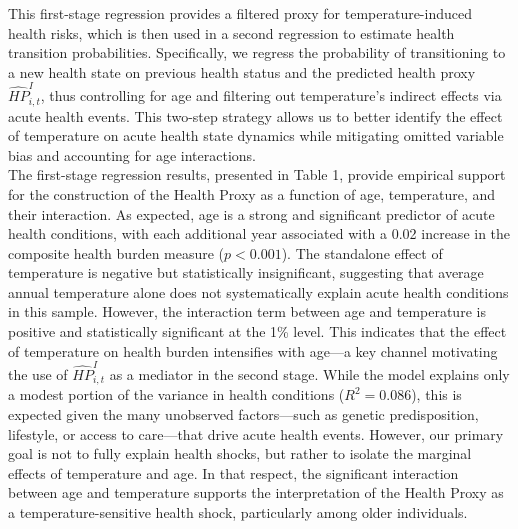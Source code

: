\documentclass{article}
\begin{document}
This first-stage regression provides a filtered proxy for temperature-induced health risks, which is then used in a second regression to estimate health transition probabilities. Specifically, we regress the probability of transitioning to a new health state on previous health status and the predicted health proxy $\widehat{HP}_{i,t}^{I}$, thus controlling for age and filtering out temperature's indirect effects via acute health events.
This two-step strategy allows us to better identify the effect of 
temperature on acute health state dynamics 
while mitigating omitted variable bias and accounting for age interactions.
\\

The first-stage regression results, presented in Table 1, provide empirical support for the construction of the Health Proxy as a function of age, temperature, and their interaction.
As expected, age is a strong and significant predictor of acute health conditions, with each additional year associated with a 0.02 increase in the composite health burden measure ($p < 0.001$).
The standalone effect of temperature is negative but statistically insignificant, suggesting that average annual temperature alone does not systematically explain acute health conditions in this sample.
However, the interaction term between age and temperature is positive and statistically significant at the 1\% level.
This indicates that the effect of temperature on health burden intensifies with age—a key channel motivating the use of $\widehat{HP}_{i,t}^I$ as a mediator in the second stage.
While the model explains only a modest portion of the variance in health conditions ($R^2 = 0.086$), this is expected given the many unobserved factors—such as genetic predisposition, lifestyle, or access to care—that drive acute health events. However, our primary goal is not to fully explain health shocks, but rather to isolate the marginal effects of temperature and age. In that respect, the significant interaction between age and temperature supports the interpretation of the Health Proxy as a temperature-sensitive health shock, particularly among older individuals.
\end{document}
